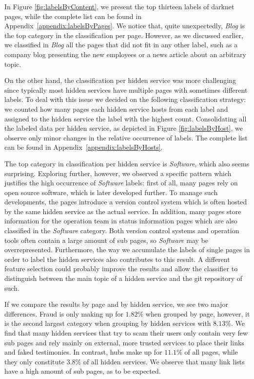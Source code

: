 In Figure \ref{fig:labelsByContent}, we present the top thirteen labels of darknet pages, while the complete list can be found in Appendix~\ref{appendix:labelsByPages}. 
We notice that, quite unexpectedly, \emph{Blog} is the top category in the classification per page. However, as we discussed earlier, we classified in \emph{Blog} all the pages that did not fit in any other label, such as a company blog presenting the new employees or a news article about an arbitrary topic.

On the other hand, the classification per hidden service was more challenging since typically most hidden services have multiple pages with sometimes different labels. To deal with this issue we decided on the following classification strategy: we counted how many pages each hidden service hosts from each label and assigned to the hidden service the label with the highest count. Consolidating all the labeled data per hidden service, as depicted in Figure \ref{fig:labelsByHost}, we observe only minor changes in the relative occurrence of labels. The complete list can be found in Appendix~\ref{appendix:labelsByHosts}.

The top category in classification per hidden service is \emph{Software}, which also seems surprising. 
Exploring further, however, we observed a specific pattern which justifies the high occurrence of \emph{Software} labels:
first of all, many pages rely on open source software, which is later developed further. To manage such developments, the pages introduce a version control system which is often hosted by the same hidden service as the actual service. In addition, many pages store information for the operation team in status information pages which are also classified in the \emph{Software} category. Both version control systems and operation tools often contain a large amount of sub pages, so \emph{Software} may be overrepresented. 
Furthermore, the way we accumulate the labels of single pages in order to label the hidden services also contributes to this result. A different feature selection could probably improve the results and allow the classifier to distinguish between the main topic of a hidden service and the git repository of such.

If we compare the results by page and by hidden service, we see two major differences. Fraud is only making up for $1.82\%$ when grouped by page, however, it is the second largest category when grouping by hidden services with $8.13\%$. We find that many hidden services that try to scam their users only contain very few sub pages and rely mainly on external, more trusted services to place their links and faked testimonies.
In contrast, hubs make up for $11.1\%$ of all pages, while they only constitute $3.8\%$ of all hidden services. We observe that many link lists have a high amount of sub pages, as to be expected.

